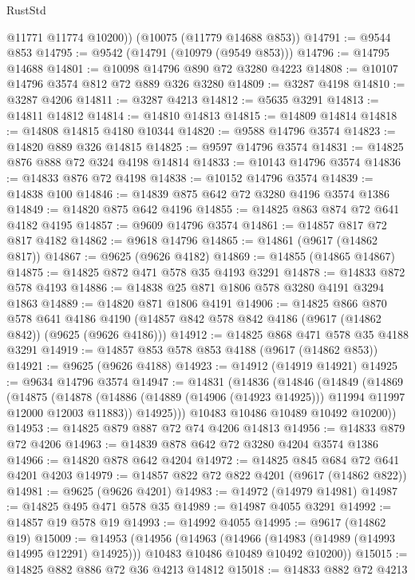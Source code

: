\begin{lexlean}{RustStd}
\begin{coremodule}
        @11771
        @11774
        @10200))
    (@10075 (@11779 @14688 @853))
@14791 := @9544 @853
@14795 := @9542 (@14791 (@10979 (@9549 @853)))
@14796 := @14795 @14688
@14801 := @10098 @14796 @890 @72 @3280 @4223
@14808 := @10107 @14796 @3574 @812 @72 @889 @326 @3280
@14809 := @3287 @4198
@14810 := @3287 @4206
@14811 := @3287 @4213
@14812 := @5635 @3291
@14813 := @14811 @14812
@14814 := @14810 @14813
@14815 := @14809 @14814
@14818 := @14808 @14815 @4180 @10344
@14820 := @9588 @14796 @3574
@14823 := @14820 @889 @326 @14815
@14825 := @9597 @14796 @3574
@14831 := @14825 @876 @888 @72 @324 @4198 @14814
@14833 := @10143 @14796 @3574
@14836 := @14833 @876 @72 @4198
@14838 := @10152 @14796 @3574
@14839 := @14838 @100
@14846 := @14839 @875 @642 @72 @3280 @4196 @3574 @1386
@14849 := @14820 @875 @642 @4196
@14855 := @14825 @863 @874 @72 @641 @4182 @4195
@14857 := @9609 @14796 @3574
@14861 := @14857 @817 @72 @817 @4182
@14862 := @9618 @14796
@14865 := @14861 (@9617 (@14862 @817))
@14867 := @9625 (@9626 @4182)
@14869 := @14855 (@14865 @14867)
@14875 := @14825 @872 @471 @578 @35 @4193 @3291
@14878 := @14833 @872 @578 @4193
@14886 := @14838 @25 @871 @1806 @578 @3280 @4191 @3294 @1863
@14889 := @14820 @871 @1806 @4191
@14906 := @14825
    @866
    @870
    @578
    @641
    @4186
    @4190
    (@14857 @842 @578 @842 @4186 (@9617 (@14862 @842)) (@9625 (@9626 @4186)))
@14912 := @14825 @868 @471 @578 @35 @4188 @3291
@14919 := @14857 @853 @578 @853 @4188 (@9617 (@14862 @853))
@14921 := @9625 (@9626 @4188)
@14923 := @14912 (@14919 @14921)
@14925 := @9634 @14796 @3574
@14947 := @14831
    (@14836
      (@14846
        (@14849
          (@14869
            (@14875
              (@14878 (@14886 (@14889 (@14906 (@14923 @14925))) @11994 @11997 @12000 @12003 @11883))
              @14925)))
        @10483
        @10486
        @10489
        @10492
        @10200))
@14953 := @14825 @879 @887 @72 @74 @4206 @14813
@14956 := @14833 @879 @72 @4206
@14963 := @14839 @878 @642 @72 @3280 @4204 @3574 @1386
@14966 := @14820 @878 @642 @4204
@14972 := @14825 @845 @684 @72 @641 @4201 @4203
@14979 := @14857 @822 @72 @822 @4201 (@9617 (@14862 @822))
@14981 := @9625 (@9626 @4201)
@14983 := @14972 (@14979 @14981)
@14987 := @14825 @495 @471 @578 @35
@14989 := @14987 @4055 @3291
@14992 := @14857 @19 @578 @19
@14993 := @14992 @4055
@14995 := @9617 (@14862 @19)
@15009 := @14953
    (@14956
      (@14963
        (@14966 (@14983 (@14989 (@14993 @14995 @12291) @14925)))
        @10483
        @10486
        @10489
        @10492
        @10200))
@15015 := @14825 @882 @886 @72 @36 @4213 @14812
@15018 := @14833 @882 @72 @4213

\end{coremodule}
\end{lexlean}
